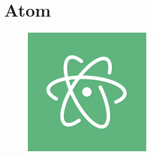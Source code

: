 \section{Atom}

\lipsum[1]
\begin{figure}
	\includegraphics[width=0.19\paperwidth]{./img/editors/atom}
\end{figure}
\lipsum[1]